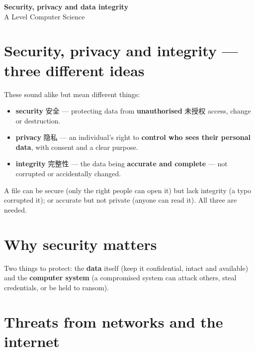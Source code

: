 \documentclass[11pt]{article}
\begin{document}
\begin{center}
  {\LARGE\bfseries Security, privacy and data integrity}\\[0.35em]
  {\large A Level Computer Science}
\end{center}
\vspace{0.6em}

\section*{Security, privacy and integrity — three different ideas}

These sound alike but mean different things:

\begin{itemize}
\item \textbf{security} 安全 — protecting data from \textbf{unauthorised} 未授权 access, change or destruction.

\item \textbf{privacy} 隐私 — an individual's right to \textbf{control who sees their personal data}, with consent and a clear purpose.

\item \textbf{integrity} 完整性 — the data being \textbf{accurate and complete} — not corrupted or accidentally changed.

\end{itemize}

A file can be secure (only the right people can open it) but lack integrity (a typo corrupted it); or accurate but not private (anyone can read it). All three are needed.

\section*{Why security matters}

Two things to protect: the \textbf{data} itself (keep it confidential, intact and available) and the \textbf{computer system} (a compromised system can attack others, steal credentials, or be held to ransom).

\section*{Threats from networks and the internet}
\end{document}
